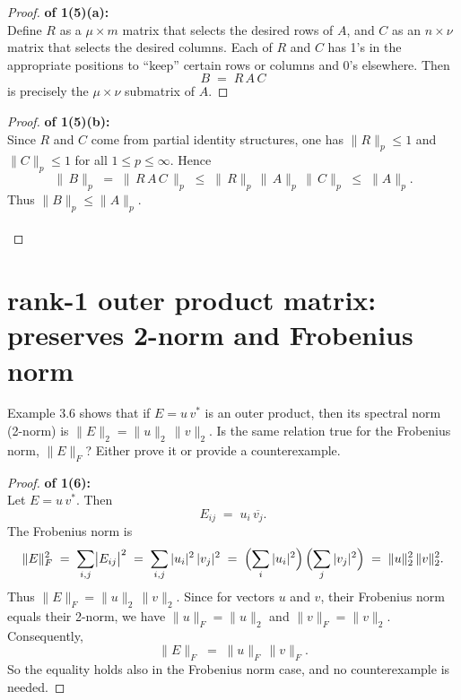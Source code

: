 \documentclass[lang=cn,11pt]{elegantbook}
\begin{document}
\begin{proof}
    \textbf{of 1(5)(a):}\\

Define \(R\) as a \(\mu\times m\) matrix that selects the desired rows of \(A\), and \(C\) as an \(n\times \nu\) matrix that selects the desired columns. Each of \(R\) and \(C\) has 1's in the appropriate positions to ``keep'' certain rows or columns and 0's elsewhere. Then
\[
  B \;=\; R\,A\,C
\]
is precisely the \(\mu\times\nu\) submatrix of \(A\).
\end{proof}

\begin{proof}
    \textbf{of 1(5)(b):}\\
Since \(R\) and \(C\) come from partial identity structures, one has \(\|R\|_p \le 1\) and \(\|C\|_p \le 1\) for all \(1\le p\le\infty\). Hence
\[
  \|\,B\|_p
  \;=\;\|\,R\,A\,C\,\|_p
  \;\le\;\|\,R\|_p\,\|\,A\|_p\,\|\,C\|_p
  \;\le\;\|A\|_p.
\]
Thus \(\|B\|_p \le \|A\|_p\).\\\\
\end{proof}

\bigskip

\section{rank-1 outer product matrix: preserves 2-norm and Frobenius norm}

Example 3.6 shows that if \(E = u\,v^*\) is an outer product, then its spectral norm (2-norm) is 
\(\|E\|_2 = \|u\|_2 \,\|v\|_2.\)
Is the same relation true for the Frobenius norm, \(\|E\|_F\)? Either prove it or provide a counterexample.

\begin{proof}
    \textbf{of 1(6):}\\
Let \(E = u\,v^*\). Then 
\[
  E_{ij} \;=\; u_i\,\overline{v_j}.
\]
The Frobenius norm is 
\[
  \|E\|_F^2
  \;=\;\sum_{i,j}\bigl|E_{ij}\bigr|^2
  \;=\;\sum_{i,j} |u_i|^2\,|v_j|^2
  \;=\;\Bigl(\sum_i |u_i|^2\Bigr)\,\Bigl(\sum_j |v_j|^2\Bigr)
  \;=\;\|u\|_2^2\,\|v\|_2^2.
\]
Thus \(\|E\|_F = \|u\|_2 \,\|v\|_2.\) Since for vectors \(u\) and \(v\), their Frobenius norm equals their 2-norm, we have \(\|u\|_F = \|u\|_2\) and \(\|v\|_F = \|v\|_2\). Consequently,
\[
  \|E\|_F 
  \;=\;\|u\|_F\,\|v\|_F.
\]
So the equality holds also in the Frobenius norm case, and no counterexample is needed.
\end{proof}
\end{document}
